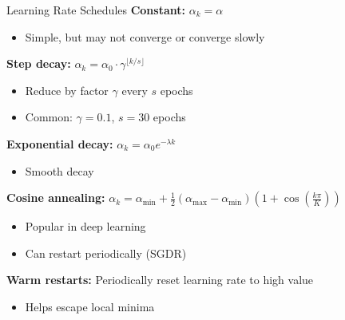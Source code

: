 \documentclass[aspectratio=169]{beamer}
\begin{document}
\begin{frame}{Learning Rate Schedules}
  \textbf{Constant:} $\alpha_k = \alpha$
  \begin{itemize}
    \item Simple, but may not converge or converge slowly
  \end{itemize}

  \vspace{0.5em}

  \textbf{Step decay:} $\alpha_k = \alpha_0 \cdot \gamma^{\lfloor k/s \rfloor}$
  \begin{itemize}
    \item Reduce by factor $\gamma$ every $s$ epochs
    \item Common: $\gamma = 0.1$, $s = 30$ epochs
  \end{itemize}

  \vspace{0.5em}

  \textbf{Exponential decay:} $\alpha_k = \alpha_0 e^{-\lambda k}$
  \begin{itemize}
    \item Smooth decay
  \end{itemize}

  \vspace{0.5em}

  \textbf{Cosine annealing:} $\alpha_k = \alpha_{\min} + \frac{1}{2}(\alpha_{\max} - \alpha_{\min})(1 + \cos(\frac{k\pi}{K}))$
  \begin{itemize}
    \item Popular in deep learning
    \item Can restart periodically (SGDR)
  \end{itemize}

  \vspace{0.5em}

  \textbf{Warm restarts:} Periodically reset learning rate to high value
  \begin{itemize}
    \item Helps escape local minima
  \end{itemize}
\end{frame}
\end{document}
